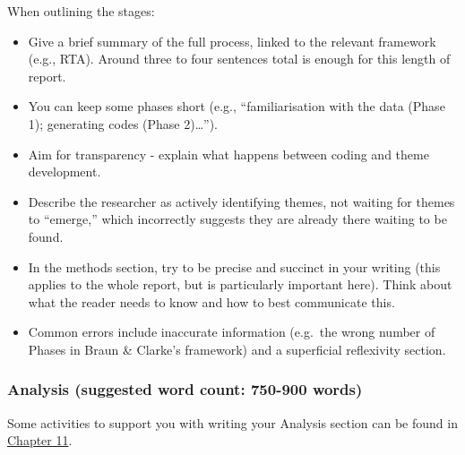 \documentclass[
  english,
  letterpaper,
  DIV=11,
  numbers=noendperiod]{scrreprt}
\providecommand{\tightlist}{%
  \setlength{\itemsep}{0pt}\setlength{\parskip}{0pt}}
\begin{document}
When outlining the stages:

\begin{itemize}
\tightlist
\item
  Give a brief summary of the full process, linked to the relevant
  framework (e.g., RTA). Around three to four sentences total is enough
  for this length of report.
\item
  You can keep some phases short (e.g., ``familiarisation with the data
  (Phase 1); generating codes (Phase 2)\ldots{}'').
\item
  Aim for transparency - explain what happens between coding and theme
  development.
\item
  Describe the researcher as actively identifying themes, not waiting
  for themes to ``emerge,'' which incorrectly suggests they are already
  there waiting to be found.
\end{itemize}

\begin{tcolorbox}[enhanced jigsaw, breakable, bottomtitle=1mm, leftrule=.75mm, opacityback=0, colbacktitle=quarto-callout-warning-color!10!white, opacitybacktitle=0.6, toprule=.15mm, colback=white, left=2mm, coltitle=black, bottomrule=.15mm, titlerule=0mm, title={Tips}, toptitle=1mm, colframe=quarto-callout-warning-color-frame, arc=.35mm, rightrule=.15mm]

\begin{itemize}
\tightlist
\item
  In the methods section, try to be precise and succinct in your writing
  (this applies to the whole report, but is particularly important
  here). Think about what the reader needs to know and how to best
  communicate this.
\item
  Common errors include inaccurate information (e.g.~the wrong number of
  Phases in Braun \& Clarke's framework) and a superficial reflexivity
  section.
\end{itemize}

\end{tcolorbox}

\subsubsection{Analysis (suggested word count: 750-900
words)}\label{analysis-suggested-word-count-750-900-words}

Some activities to support you with writing your Analysis section can be
found in \hyperref[eval_analysis]{Chapter 11}.
\end{document}
